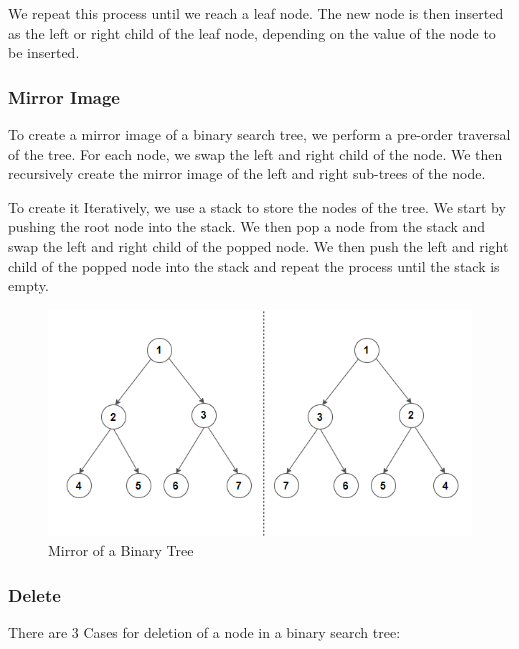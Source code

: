 \documentclass[11pt]{article}
\begin{document}
We repeat this process until we reach a leaf node. The new node is then inserted as the left or right child of the leaf node, depending on the value of the node to be inserted.
\subsubsection{Mirror Image}

To create a mirror image of a binary search tree, we perform a pre-order traversal of the tree. For each node, we swap the left and right child of the node. We then recursively create the mirror image of the left and right sub-trees of the node.

To create it Iteratively, we use a stack to store the nodes of the tree. We start by pushing the root node into the stack. We then pop a node from the stack and swap the left and right child of the popped node. We then push the left and right child of the popped node into the stack and repeat the process until the stack is empty.

\begin{figure}[H]
    \centering
    \includegraphics[scale=0.5]{figures/Binary-Tree-Mirror.png}
    \caption{Mirror of a Binary Tree}
    \label{fig:Mirror of a Binary Tree}
\end{figure}


\subsubsection{Delete}

There are 3 Cases for deletion of a node in a binary search tree:
\end{document}
